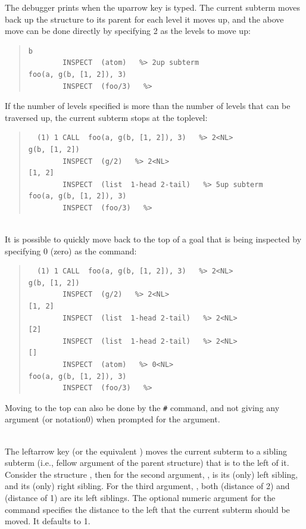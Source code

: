 \begin{descr}{1cm}
The debugger prints  when the uparrow key is typed. The
current subterm moves back up the structure to its parent for each level it
moves up, and the above move can be done directly by specifying 2 as the
levels to move up:

\begin{quote}
\begin{verbatim}
b
        INSPECT  (atom)   %> 2up subterm
foo(a, g(b, [1, 2]), 3)
        INSPECT  (foo/3)   %>
\end{verbatim}
\end{quote}

If the number of levels specified is more than the number of levels that
can be traversed up, the current subterm stops at the toplevel:

\begin{quote}
\begin{verbatim}
  (1) 1 CALL  foo(a, g(b, [1, 2]), 3)   %> 2<NL>
g(b, [1, 2])
        INSPECT  (g/2)   %> 2<NL>
[1, 2]
        INSPECT  (list  1-head 2-tail)   %> 5up subterm
foo(a, g(b, [1, 2]), 3)
        INSPECT  (foo/3)   %>
\end{verbatim}
\end{quote}

\\
It is possible to quickly move back to the top of a goal that is being
inspected by specifying 0 (zero) as the command:

\begin{quote}
\begin{verbatim}
  (1) 1 CALL  foo(a, g(b, [1, 2]), 3)   %> 2<NL>
g(b, [1, 2])
        INSPECT  (g/2)   %> 2<NL>
[1, 2]
        INSPECT  (list  1-head 2-tail)   %> 2<NL>
[2]
        INSPECT  (list  1-head 2-tail)   %> 2<NL>
[]
        INSPECT  (atom)   %> 0<NL>
foo(a, g(b, [1, 2]), 3)
        INSPECT  (foo/3)   %>
\end{verbatim}
\end{quote}

Moving to the top can also be done by the \verb:#: command, and not giving
any argument (or notation{0}) when prompted for the argument.

\\
The leftarrow key (or the equivalent ) moves the current subterm to
a sibling subterm (i.e., fellow argument of the parent structure) that is to
the left of it. Consider the structure , then
for the second argument, ,  is its (only)
left
sibling, and  its (only) right sibling. For the third argument,
, both  (distance of 2) and
 (distance of 1) are its left siblings. The optional
numeric argument for the command specifies the distance to the left that
the current subterm should be moved. It defaults to 1.



\end{descr}
